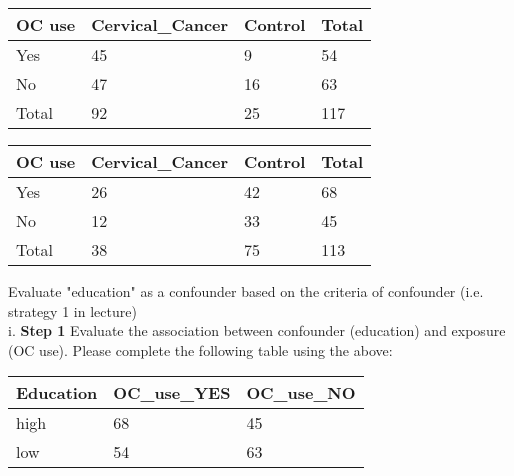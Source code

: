\documentclass[12pt]{article}
\begin{document}
\begin{multicols}{2}

\begin{table}[H]
\caption*{Table 1: low education level (< 12 years)}
\begin{table}[ht]
\centering
\begin{tabular}{llll}
  \hline
OC use & Cervical\_Cancer & Control & Total \\ 
  \hline
Yes & 45 & 9 & 54 \\ 
  No & 47 & 16 & 63 \\ 
  Total & 92 & 25 & 117 \\ 
   \hline
\end{tabular}
\end{table}\end{table}


\begin{table}[H]
\caption*{Table 2: high education level (+ 12 years)}
\begin{table}[ht]
\centering
\begin{tabular}{llll}
  \hline
OC use & Cervical\_Cancer & Control & Total \\ 
  \hline
Yes & 26 & 42 & 68 \\ 
  No & 12 & 33 & 45 \\ 
  Total & 38 & 75 & 113 \\ 
   \hline
\end{tabular}
\end{table}\end{table}

\end{multicols}

\noindent Evaluate "education" as a confounder based on the criteria of confounder (i.e. strategy 1 in lecture)\\

i. \textbf{Step 1} Evaluate the association between confounder (education) and exposure (OC use).  Please complete the following table using the above:


\begin{table}[H]
\caption*{Table 1 and 2: OR between education and OC use}
\begin{table}[ht]
\centering
\begin{tabular}{lll}
  \hline
Education & OC\_use\_YES & OC\_use\_NO \\ 
  \hline
high & 68 & 45 \\ 
  low & 54 & 63 \\ 
   \hline
\end{tabular}
\end{table}\end{table}
\end{document}
